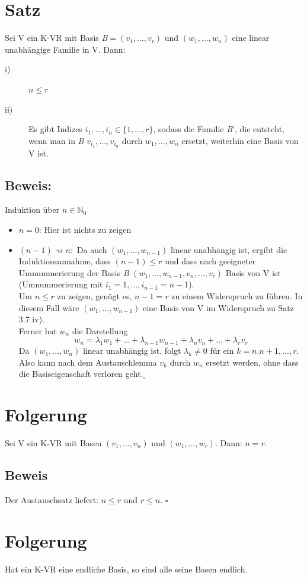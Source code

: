 \documentclass{scrbook}
\begin{document}
\section{Satz}
Sei V ein K-VR mit Basis \textit{B}$=(v_1,...,v_r)$ und $(w_1,...,w_n)$ eine linear unabhängige Familie in V. Dann:
\begin{description}
\item[i)]$n\leq r$
\item[ii)] Es gibt Indizes $i_1,...,i_n\in \{1,...,r\}$, sodass die Familie \textit{B}', die entsteht, wenn man in \textit{B} $v_{i_1},...,v_{i_n}$ durch $w_1,...,w_n$ ersetzt, weiterhin eine Basis von V ist.
\end{description}
\subsection*{Beweis:}
Induktion über $n \in \mathbb{N}_0$
\begin{itemize}
\item $n=0$: Hier ist nichts zu zeigen
\item $(n-1)\rightsquigarrow n:$ Da auch $(w_1,...,w_{n-1})$ linear unabhängig ist, ergibt die Induktionsannahme, dass $(n-1)\leq r$ und dass nach geeigneter Umnummerierung der Basis \textit{B} $(w_1,...,w_{n-1},v_n,...,v_r)$ Basis von V ist (Umnummerierung mit $i_1=1,...,i_{n-1}=n-1$).\\
Um $n\leq r$ zu zeigen, genügt es, $n-1=r$ zu einem Widerspruch zu führen. In diesem Fall wäre $(w_1,...,w_{n-1})$ eine Basis von V im Widerspruch zu Satz 3.7 iv).\\
Ferner hat $w_n$ die Darstellung
\[
w_n=\lambda_1w_1+...+\lambda_{n-1}w_{n-1}+\lambda_nv_n+...+\lambda_rv_r
\]
Da $(w_1,...,w_n)$ linear unabhängig ist, folgt $\lambda_k \neq 0$ für ein $k=n.n+1,...,r$. Also kann nach dem Austauschlemma $v_k$ durch $w_n$ ersetzt werden, ohne dass die Basiseigenschaft verloren geht.$_\square$
\end{itemize}
\section{Folgerung}
Sei V ein K-VR mit Basen $(v_1,...,v_n)$ und $(w_1,...,w_r)$. Dann: $n=r$.
\subsection*{Beweis}
Der Austauschsatz liefert: $n\leq r$ und $r\leq n$. $\square$
\section{Folgerung}
Hat ein K-VR eine endliche Basis, so sind alle seine Basen endlich.
\end{document}
